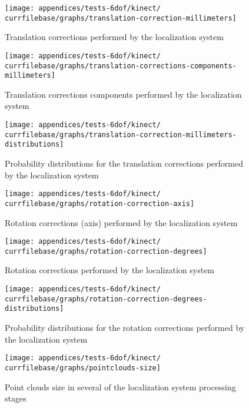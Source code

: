 \begin{figure}[H]
	\centering
	\texttt{[image: appendices/tests-6dof/kinect/\\currfilebase/graphs/translation-correction-millimeters]}
	\caption{Translation corrections performed by the localization system}
\end{figure}

\begin{figure}[H]
	\centering
	\texttt{[image: appendices/tests-6dof/kinect/\\currfilebase/graphs/translation-corrections-components-millimeters]}
	\caption{Translation corrections components performed by the localization system}
\end{figure}

\begin{figure}[H]
	\centering
	\texttt{[image: appendices/tests-6dof/kinect/\\currfilebase/graphs/translation-correction-millimeters-distributions]}
	\caption{Probability distributions for the translation corrections performed by the localization system}
\end{figure}


\begin{figure}[H]
	\centering
	\texttt{[image: appendices/tests-6dof/kinect/\\currfilebase/graphs/rotation-correction-axis]}
	\caption{Rotation corrections (axis) performed by the localization system}
\end{figure}

\begin{figure}[H]
	\centering
	\texttt{[image: appendices/tests-6dof/kinect/\\currfilebase/graphs/rotation-correction-degrees]}
	\caption{Rotation corrections performed by the localization system}
\end{figure}

\begin{figure}[H]
	\centering
	\texttt{[image: appendices/tests-6dof/kinect/\\currfilebase/graphs/rotation-correction-degrees-distributions]}
	\caption{Probability distributions for the rotation corrections performed by the localization system}
\end{figure}


\begin{figure}[H]
	\centering
	\texttt{[image: appendices/tests-6dof/kinect/\\currfilebase/graphs/pointclouds-size]}
	\caption{Point clouds size in several of the localization system processing stages}
\end{figure}

